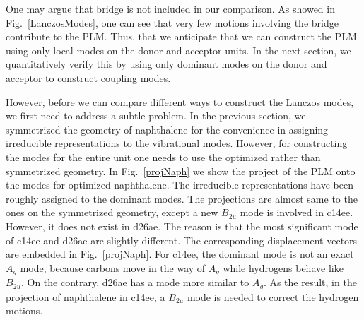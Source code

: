 
One may argue that bridge is not included in our comparison.
As showed in Fig.~\ref{LanczosModes}, one can see that very few motions involving the bridge contribute to the PLM.
Thus, that we anticipate that we can construct the PLM using only local modes on the donor and acceptor units.
 In the next section, we  quantitatively verify this by using only
dominant modes on the  donor and acceptor to construct coupling modes.

However, before we can compare different ways to construct the Lanczos modes, we first need to
address a  subtle problem.   In the previous section, we symmetrized the geometry of naphthalene
for the convenience in assigning  irreducible representations to the vibrational modes.
However, for constructing the modes
for the entire unit one needs to use the optimized rather than symmetrized geometry.
In Fig.~\ref{projNaph}  we show the project of the PLM onto the modes for optimized
naphthalene.  The irreducible representations have been roughly assigned to the dominant modes.
The projections are
almost same to the ones on the symmetrized geometry, except a new $B_{2u}$ mode is involved
in c14ee. However, it does not exist in d26ae. The reason is that the most significant
mode of c14ee and d26ae are slightly different. The corresponding displacement vectors are
embedded in Fig.~\ref{projNaph}. For c14ee, the dominant mode is not an exact $A_g$ mode, because
carbons move in the way of $A_g$ while
hydrogens behave like $B_{2u}$. On the contrary, d26ae has
a mode more similar to $A_g$.
As the result, in the projection of naphthalene in c14ee, a  $B_{2u}$
mode is needed to correct the hydrogen motions.


